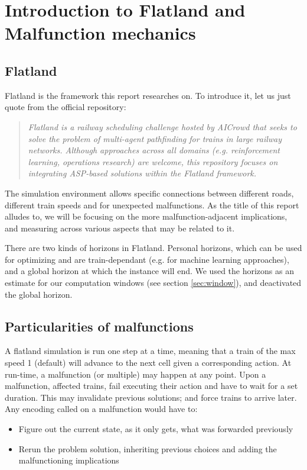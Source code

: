 \section{Introduction to Flatland and Malfunction mechanics}
\subsection{Flatland}
Flatland\cite{flatland} is the framework this report researches on. To introduce it, let us just quote from the official repository:
\begin{quote}
\emph{	Flatland is a railway scheduling challenge hosted by AICrowd that seeks to solve the problem of multi-agent pathfinding for trains in large railway networks. Although approaches across all domains (e.g. reinforcement learning, operations research) are welcome, this repository focuses on integrating ASP-based solutions within the Flatland framework.}
\end{quote}

The simulation environment allows specific connections between different roads, different train speeds and for unexpected malfunctions. As the title of this report alludes to, we will be focusing on the more malfunction-adjacent implications, and measuring across various aspects that may be related to it.

There are two kinds of horizons in Flatland. Personal horizons, which can be used for optimizing and are train-dependant (e.g. for machine learning approaches), and a global horizon at which the instance will end. We used the horizons as an estimate for our computation windows (see section \ref{sec:window}), and deactivated the global horizon.

\subsection{Particularities of malfunctions}
A flatland simulation is run one step at a time, meaning that a train of the max speed 1 (default) will advance to the next cell given a corresponding action. At run-time, a malfunction (or multiple) may happen at any point. Upon a malfunction, affected trains, fail executing their action and have to wait for a set duration. This may invalidate previous solutions; and force trains to arrive later.
Any encoding called on a malfunction would have to:
\begin{itemize}
	\item Figure out the current state, as it only gets, what was forwarded previously
	\item Rerun the problem solution, inheriting previous choices and adding the malfunctioning implications
\end{itemize}

